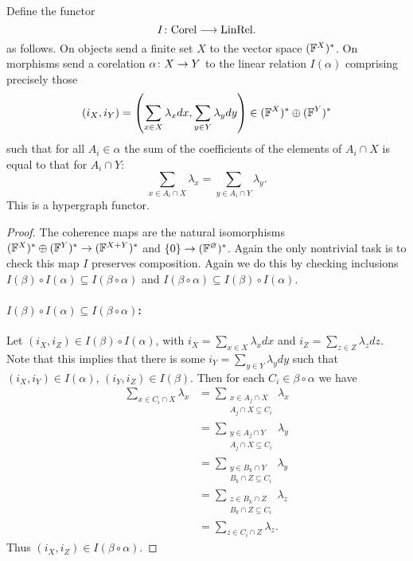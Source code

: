 \begin{proposition}
  Define the functor
  \[
    I{\colon} \mathrm{Corel} \longrightarrow \mathrm{LinRel}.
  \]
  as follows. On objects send a finite set $X$ to the vector space
  $({\mathbb F}^{X})^\ast$. On morphisms send a corelation $\alpha{\colon} X \to Y$
  to the linear relation $I(\alpha)$ comprising precisely those 
  \[
    (i_X,i_Y) = \left(\sum_{x \in X} \lambda_xdx,\sum_{y \in Y}
    \lambda_ydy\right)  \in ({\mathbb F}^{X})^\ast \oplus ({\mathbb F}^{Y})^\ast
  \]
  such that for all $A_i \in \alpha$ the sum of the coefficients of the elements
  of $A_i \cap X$ is equal to that for $A_i \cap Y$:
  \[
    \sum_{x \in A_i \cap X} \lambda_x = \sum_{y \in A_i \cap Y} \lambda_y.
  \]
  This is a hypergraph functor.
\end{proposition}
\begin{proof}
The coherence maps are the natural isomorphisms $({\mathbb F}^X)^\ast \oplus ({\mathbb F}^Y)^\ast
\to ({\mathbb F}^{X+Y})^\ast$ and $\{0\} \to ({\mathbb F}^\varnothing)^\ast$. Again the only
nontrivial task is to check this map $I$ preserves composition. Again we do this
by checking inclusions $I(\beta) \circ I(\alpha) \subseteq I(\beta\circ\alpha)$
and $I(\beta\circ\alpha) \subseteq I(\beta) \circ I(\alpha)$. 

\paragraph{$I(\beta) \circ I(\alpha) \subseteq I(\beta\circ\alpha)$:} Let
$(i_X,i_Z) \in I(\beta)\circ I(\alpha)$, with $i_X = \sum_{x \in X} \lambda_x dx$
and $i_Z = \sum_{z \in Z} \lambda_z dz$. Note that this implies that there is
some $i_Y = \sum_{y \in Y} \lambda_y dy$ such that $(i_X,i_Y) \in I(\alpha)$,
$(i_Y,i_Z) \in I(\beta)$. Then for each $C_i \in \beta\circ\alpha$ we have
\begin{align*}
  \sum_{x \in C_i \cap X} \lambda_x
  &= \sum_{\substack{x \in A_j \cap X \\ A_j \cap X \subseteq C_i}}
  \lambda_x \\
  &= \sum_{\substack{y \in A_j \cap Y \\ A_j \cap X \subseteq C_i}}
  \lambda_y \tag{By definition of $I(\alpha)$}\\
  &= \sum_{\substack{y \in B_k \cap Y \\ B_k \cap Z \subseteq C_i}}
  \lambda_y \tag{See composition of corelations}\\
  &= \sum_{\substack{z \in B_k \cap Z \\ B_k \cap Z \subseteq C_i}}
  \lambda_z \tag{By definition of $I(\beta)$} \\
  &= \sum_{z \in C_i \cap Z} \lambda_z. 
\end{align*}
Thus $(i_X,i_Z) \in I(\beta\circ\alpha)$.


\end{proof}
